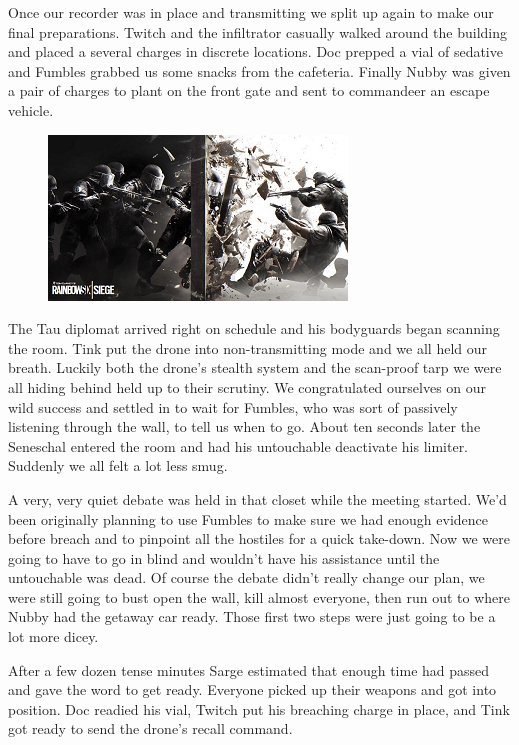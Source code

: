 Once our recorder was in place and transmitting we split up again to make our final preparations. 
Twitch and the infiltrator casually walked around the building and placed a several charges in discrete locations. 
Doc prepped a vial of sedative and Fumbles grabbed us some snacks from the cafeteria. 
Finally Nubby was given a pair of charges to plant on the front gate and sent to commandeer an escape vehicle.

\begin{figure}
	\begin{center}
		\includegraphics[width=\figwidth]{pics/10/62.png}
	\end{center}
\end{figure}
The Tau diplomat arrived right on schedule and his bodyguards began scanning the room. 
Tink put the drone into non-transmitting mode and we all held our breath. 
Luckily both the drone's stealth system and the scan-proof tarp we were all hiding behind held up to their scrutiny. 
We congratulated ourselves on our wild success and settled in to wait for Fumbles, who was sort of passively listening through the wall, to tell us when to go. 
About ten seconds later the Seneschal entered the room and had his untouchable deactivate his limiter. 
Suddenly we all felt a lot less smug.

A very, very quiet debate was held in that closet while the meeting started. 
We'd been originally planning to use Fumbles to make sure we had enough evidence before breach and to pinpoint all the hostiles for a quick take-down. 
Now we were going to have to go in blind and wouldn't have his assistance until the untouchable was dead. 
Of course the debate didn't really change our plan, we were still going to bust open the wall, kill almost everyone, then run out to where Nubby had the getaway car ready. 
Those first two steps were just going to be a lot more dicey.

After a few dozen tense minutes Sarge estimated that enough time had passed and gave the word to get ready. 
Everyone picked up their weapons and got into position. 
Doc readied his vial, Twitch put his breaching charge in place, and Tink got ready to send the drone's recall command. 


